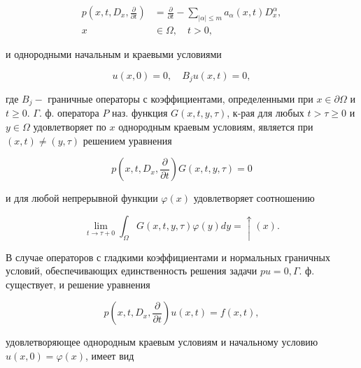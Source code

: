\documentclass[10pt]{article}
\begin{document}
\[

\begin{aligned}

p\left(x, t, D_{x}, \frac{\partial}{\partial t}\right) & =\frac{\partial}{\partial t}-\sum_{|\alpha| \leqslant m} a_{\alpha}(x, t) D_{x}^{\alpha}, \\

x & \in \Omega, \quad t>0,

\end{aligned}

\]



и однородными начальным и краевыми условиями



\[

u(x, 0)=0, \quad B_{j} u(x, t)=0,

\]



где $B_{j}-$ граничные операторы с коэффициентами, определенными при $x \in \partial \Omega$ и $t \geqslant 0$. $\Gamma$. ф. оператора $P$ наз. функция $G(x, t, y, \tau)$, к-рая для любых $t>\tau \geqslant 0$ и $y \in \Omega$ удовлетворяет по $x$ однородным краевым условиям, является при $(x, t) \neq(y, \tau)$ решением уравнения



\[

p\left(x, t, D_{x}, \frac{\partial}{\partial t}\right) G(x, t, y, \tau)=0

\]



и для любой непрерывной функции $\varphi(x)$ удовлетворяет соотношению



\[

\lim _{t \rightarrow \tau+0} \int_{\Omega} G(x, t, y, \tau) \varphi(y) d y=\uparrow(x) .

\]



В случае операторов с гладкими коэффициентами и нормальных граничных условий, обеспечивающих единственность решения задачи $p u=0, \Gamma$. ф. существует, и решение уравнения



\[

p\left(x, t, D_{x}, \frac{\partial}{\partial t}\right) u(x, t)=f(x, t),

\]



удовлетворяющее однородным краевым условиям и начальному условию $u(x, 0)=\varphi(x)$, имеет вид
\end{document}
